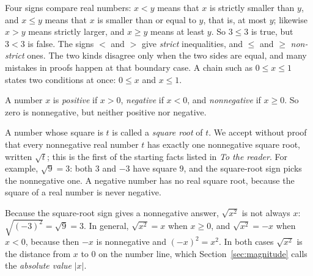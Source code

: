 Four signs compare real numbers: $x<y$ means that $x$ is strictly smaller than $y$, and $x\le y$ means that $x$ is smaller than or equal to $y$, that is, at most $y$; likewise $x>y$ means strictly larger, and $x\ge y$ means at least $y$. So $3\le3$ is true, but $3<3$ is false. The signs $<$ and $>$ give \emph{strict} inequalities, and $\le$ and $\ge$ \emph{non-strict} ones. The two kinds disagree only when the two sides are equal, and many mistakes in proofs happen at that boundary case. A chain such as $0\le x\le1$ states two conditions at once: $0\le x$ and $x\le1$.

A number $x$ is \emph{positive} if $x>0$, \emph{negative} if $x<0$, and \emph{nonnegative} if $x\ge0$. So zero is nonnegative, but neither positive nor negative.

A number whose square is $t$ is called a \emph{square root} of $t$. We accept without proof that every nonnegative real number $t$ has exactly one nonnegative square root, written $\sqrt t$; this is the first of the starting facts listed in \emph{To the reader}. For example, $\sqrt9=3$: both $3$ and $-3$ have square $9$, and the square-root sign picks the nonnegative one. A negative number has no real square root, because the square of a real number is never negative.

Because the square-root sign gives a nonnegative answer, $\sqrt{x^2}$ is not always $x$: $\sqrt{(-3)^2}=\sqrt9=3$. In general, $\sqrt{x^2}=x$ when $x\ge0$, and $\sqrt{x^2}=-x$ when $x<0$, because then $-x$ is nonnegative and $(-x)^2=x^2$. In both cases $\sqrt{x^2}$ is the distance from $x$ to $0$ on the number line, which Section~\ref{sec:magnitude} calls the \emph{absolute value} $|x|$.
